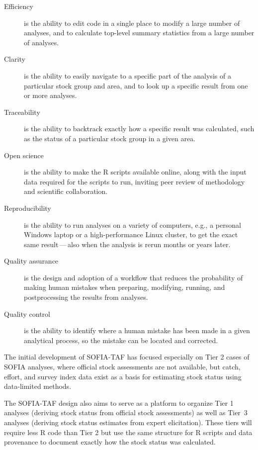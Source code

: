 \documentclass[12pt]{article}
\begin{document}
\begin{description}
  \item[Efficiency] is the ability to edit code in a single place to modify a
  large number of analyses, and to calculate top-level summary statistics from a
  large number of analyses.\\[-2.5ex]
  \item[Clarity] is the ability to easily navigate to a specific part of the
  analysis of a particular stock group and area, and to look up a specific
  result from one or more analyses.\\[-2.5ex]
  \item[Traceability] is the ability to backtrack exactly how a specific result
  was calculated, such as the status of a particular stock group in a given
  area.\\[-2.5ex]
  \item[Open science] is the ability to make the R scripts available online,
  along with the input data required for the scripts to run, inviting peer
  review of methodology and scientific collaboration.\\[-2.5ex]
  \item[Reproducibility] is the ability to run analyses on a variety of
  computers, e.g., a personal Windows laptop or a high-performance Linux
  cluster, to get the exact same result$\,$---$\,$also when the analysis is
  rerun months or years later.\\[-2.5ex]
  \item[Quality assurance] is the design and adoption of a workflow that reduces
  the probability of making human mistakes when preparing, modifying, running,
  and postprocessing the results from analyses.\\[-2.5ex]
  \item[Quality control] is the ability to identify where a human mistake has
  been made in a given analytical process, so the mistake can be located and
  corrected.\\[-1.5ex]
\end{description}

The initial development of SOFIA-TAF has focused especially on Tier 2 cases of
SOFIA analyses, where official stock assessments are not available, but catch,
effort, and survey index data exist as a basis for estimating stock status using
data-limited methods.

The SOFIA-TAF design also aims to serve as a platform to organize Tier 1
analyses (deriving stock status from official stock assessments) as well as
Tier~3 analyses (deriving stock status estimates from expert elicitation). These
tiers will require less R code than Tier 2 but use the same structure for R
scripts and data provenance to document exactly how the stock status was
calculated.
\end{document}
